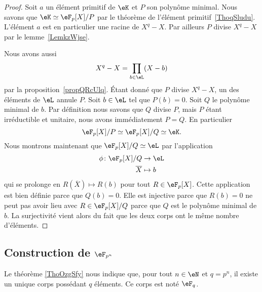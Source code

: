 \begin{proof}
	Soit \( a\) un élément primitif de \( \eK\) et \( P\) son polynôme minimal. Nous savons que \( \eK\simeq \eF_p[X]/P\) par le théorème de l'élément primitif~\ref{ThoqSludu}. L'élément \( a\) est en particulier une racine de \( X^q-X\). Par ailleurs \( P\) divise \( X^q-X\) par le lemme~\ref{LemkzWjse}.

	Nous avons aussi
	\begin{equation}
		X^q-X=\prod_{b\in \eL}(X-b)
	\end{equation}
	par la proposition~\ref{propQRcUlq}. Étant donné que \( P\) divise \( X^q-X\), un des éléments de \( \eL\) annule \( P\). Soit \( b\in \eL\) tel que \( P(b)=0\). Soit \( Q\) le polynôme minimal de \( b\). Par définition nous savons que \( Q\) divise \( P\), mais \( P\) étant irréductible et unitaire, nous avons immédiatement \( P=Q\). En particulier
	\begin{equation}
		\eF_p[X]/P\simeq\eF_p[X]/Q\simeq \eK.
	\end{equation}
	Nous montrons maintenant que \( \eF_p[X]/Q\simeq \eL\) par l'application
	\begin{equation}
		\begin{aligned}
			\phi\colon \eF_p[X]/Q & \to \eL   \\
			\overline        X    & \mapsto b
		\end{aligned}
	\end{equation}
	qui se prolonge en \( R(\overline X)\mapsto R(b)\) pour tout \( R\in \eF_p[X]\). Cette application est bien définie parce que \( Q(b)=0\). Elle est injective parce que \( R(b)=0\) ne peut pas avoir lieu avec \( R\in \eF_p[X]/Q\) parce que \( Q\) est le polynôme minimal de \( b\). La surjectivité vient alors du fait que les deux corps ont le même nombre d'éléments.
\end{proof}

\subsection{Construction de \( \eF_{p^n}\)}

Le théorème \ref{ThoOzgSfy} nous indique que, pour tout \( n\in \eN\) et \( q=p^n\), il existe un unique corps possédant \( q\) éléments. Ce corps est noté \( \eF_{q}\).

